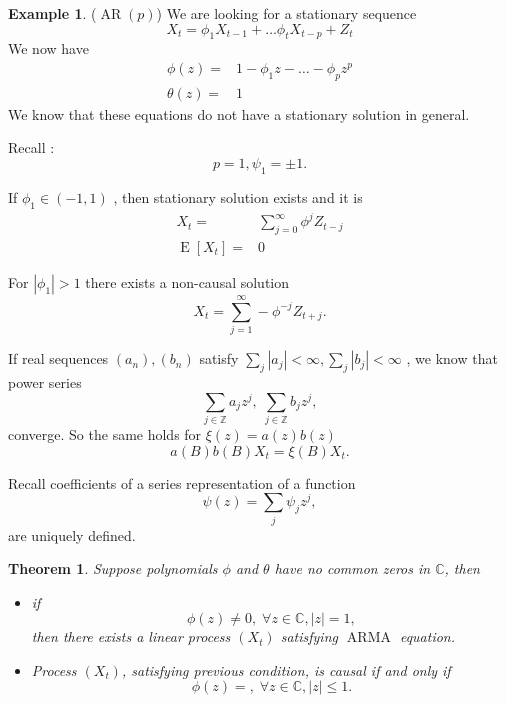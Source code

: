 \documentclass[12pt,a4paper, notitlepage]{book}
\theoremstyle{definition} %
\newtheorem{example}[definition]{Example}
\theoremstyle{plain} %
\newtheorem{theorem}[definition]{Theorem}
\newcommand{\Z}{\mathbb Z}
\newcommand{\C}{\mathbb C}
\DeclareMathOperator{\E}{E}
\DeclareMathOperator{\Arma}{ARMA}
\DeclareMathOperator{\Ar}{AR}
\begin{document}
\begin{example} ($ \Ar(p) $)
We are looking for a stationary sequence 
\[ X_t = \phi _1 X_{t-1} + \ldots \phi _t X_{t-p} + Z_t  \]
We now have
\begin{align*}
\phi(z) = & 1 - \phi _1 z - \ldots - \phi _p z^p \\
\theta(z)  = & 1 
\end{align*}
We know that these equations do not have a stationary solution in general.

Recall : 
\[p=1, \psi _1 = \pm 1 . \]

If $ \phi _1 \in (-1, 1) $ , then stationary solution exists and it is 
\begin{align*} 
X_t = & \sum _{j=0} ^{\infty} \phi ^j Z_{t-j}  \\
\E[X_t] = & 0
\end{align*}

For $ | \phi _1 | >1 $ there exists a non-causal solution 
\[ X_t = \sum _{j=1} ^{\infty} - \phi ^{-j} Z_{t+j} . \] 


\end{example}


If real sequences $ (a_n), (b_n) $ satisfy $ \sum_j |a_j| < \infty , \sum _j |b_j| < \infty $ , 
we know that power series 
\[ \sum _{j \in \Z} a_j z^j , \; \sum _{j \in \Z} b_j z^j , \]
converge. So the same holds for 
$\xi (z) = a(z) b(z)$ 
\[ a(B) b(B) X_t = \xi (B) X_t . \]


Recall coefficients of a series representation of a function
\[ \psi (z) = \sum _j \psi _j z^j ,  \]
are uniquely defined.


\begin{theorem}
Suppose polynomials $ \phi $ and $ \theta $ have no common zeros in $ \C$, then 
\begin{itemize}
\item if \[ \phi (z) \neq 0 , \; \forall z \in \C , |z| = 1 , \]
then there exists a linear process $ (X_t) $ satisfying $ \Arma$ equation. 
\item Process $ (X_t) $, satisfying previous condition, is causal if and only if 
\[ \phi (z) = , \; \forall z \in \C, |z| \leq 1 . \label{eq:4i} \]
\end{itemize}
\end{theorem}
\end{document}

